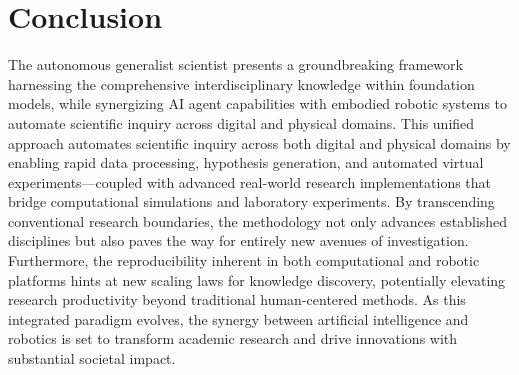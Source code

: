 \section*{Conclusion}

The autonomous generalist scientist presents a groundbreaking framework harnessing the comprehensive interdisciplinary knowledge within foundation models, while synergizing AI agent capabilities with embodied robotic systems to automate scientific inquiry across digital and physical domains. This unified approach automates scientific inquiry across both digital and physical domains by enabling rapid data processing, hypothesis generation, and automated virtual experiments—coupled with advanced real-world research implementations that bridge computational simulations and laboratory experiments. By transcending conventional research boundaries, the methodology not only advances established disciplines but also paves the way for entirely new avenues of investigation. Furthermore, the reproducibility inherent in both computational and robotic platforms hints at new scaling laws for knowledge discovery, potentially elevating research productivity beyond traditional human-centered methods. As this integrated paradigm evolves, the synergy between artificial intelligence and robotics is set to transform academic research and drive innovations with substantial societal impact.